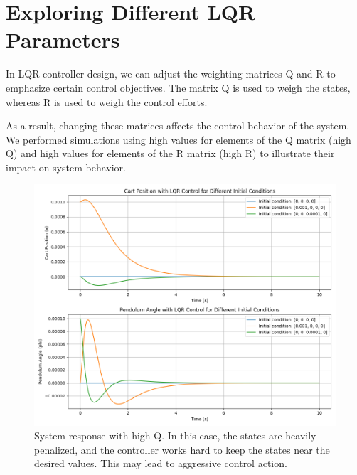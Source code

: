\documentclass[11pt,twocolumn,twoside,lineno]{pnas-new}
\begin{document}
\section{Exploring Different LQR Parameters}

In LQR controller design, we can adjust the weighting matrices Q and R to emphasize certain control objectives. The matrix Q is used to weigh the states, whereas R is used to weigh the control efforts. 

As a result, changing these matrices affects the control behavior of the system. We performed simulations using high values for elements of the Q matrix (high Q) and high values for elements of the R matrix (high R) to illustrate their impact on system behavior.

\begin{figure}[ht]
    \centering
    \includegraphics[width=\linewidth]{simulations/high_q_rate.png}
    \caption{System response with high Q. In this case, the states are heavily penalized, and the controller works hard to keep the states near the desired values. This may lead to aggressive control action.}
    \label{fig:high_q}
\end{figure}
\end{document}
